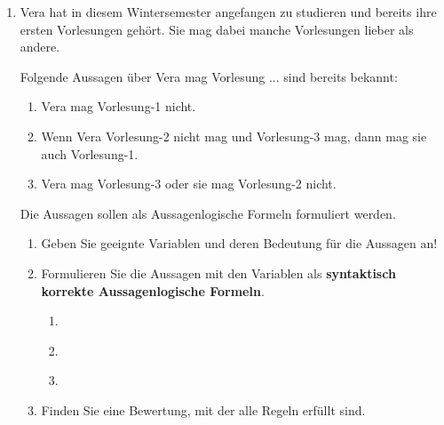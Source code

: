
\begin{enumerate}
  \item{
    Vera hat in diesem Wintersemester angefangen zu studieren und bereits ihre
    ersten Vorlesungen gehört.
    Sie mag dabei manche Vorlesungen lieber als andere.

    Folgende Aussagen über {\glqq}Vera mag Vorlesung ...{\grqq} sind bereits bekannt:

    {
      \renewcommand{\labelenumii}{(\roman{enumii})}
      \begin{enumerate}
        \item{Vera mag Vorlesung-1 nicht.}
        \item{Wenn Vera Vorlesung-2 nicht mag und Vorlesung-3 mag, dann mag sie auch Vorlesung-1.}
        \item{Vera mag Vorlesung-3 oder sie mag Vorlesung-2 nicht.}
      \end{enumerate}
    }

    Die Aussagen sollen als Aussagenlogische Formeln formuliert werden.

    \begin{enumerate}
      \item {
        Geben Sie geeignte Variablen und deren Bedeutung für die Aussagen an!

      }
      \item {
        Formulieren Sie die Aussagen mit den Variablen als
        \textbf{syntaktisch korrekte Aussagenlogische Formeln}.
        \begin{enumerate}
          \item{
          }
          \item{
          }
          \item{
          }
        \end{enumerate}
        \solution{}{\vspace{20pt}} %
      }
      \item {
        Finden Sie eine Bewertung, mit der alle Regeln erfüllt sind.

}
\end{enumerate}}
\end{enumerate}
